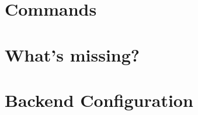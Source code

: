 \documentclass[a4paper]{article}
\begin{document}
\section*{Commands}


\section*{What's missing?}


\section*{Backend Configuration}
\end{document}
